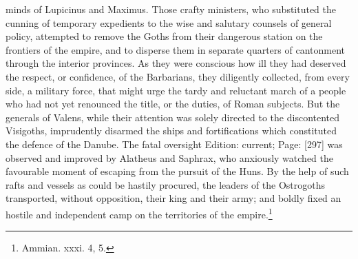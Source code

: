 minds of Lupicinus and Maximus. Those crafty ministers, who substituted the cunning of temporary expedients to the wise and salutary counsels of general policy, attempted to remove the Goths from their dangerous station on the frontiers of the empire, and to disperse them in separate quarters of cantonment through the interior provinces. As they were conscious how ill they had deserved the respect, or confidence, of the Barbarians, they diligently collected, from every side, a military force, that might urge the tardy and reluctant march of a people who had not yet renounced the title, or the duties, of Roman subjects. But the generals of Valens, while their attention was solely directed to the discontented Visigoths, imprudently disarmed the ships and fortifications which constituted the defence of the Danube. The fatal oversight Edition: current; Page: [297] was observed and improved by Alatheus and Saphrax, who anxiously watched the favourable moment of escaping from the pursuit of the Huns. By the help of such rafts and vessels as could be hastily procured, the leaders of the Ostrogoths transported, without opposition, their king and their army; and boldly fixed an hostile and independent camp on the territories of the empire.\footnote{Ammian. xxxi. 4, 5.}

